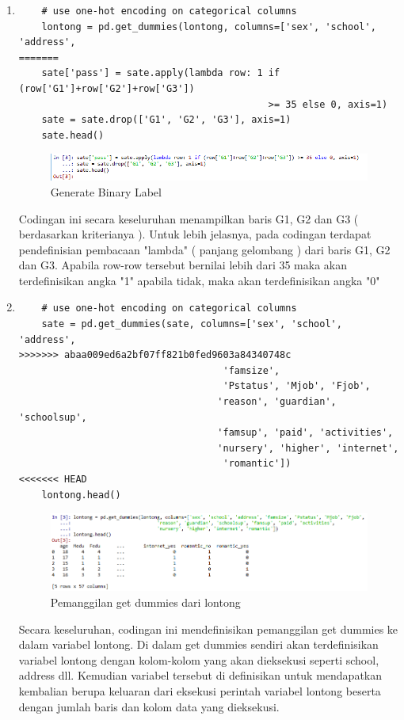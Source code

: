 \begin{enumerate}
\item
\begin{verbatim}
	# use one-hot encoding on categorical columns
	lontong = pd.get_dummies(lontong, columns=['sex', 'school', 'address', 
=======
	sate['pass'] = sate.apply(lambda row: 1 if (row['G1']+row['G2']+row['G3']) 
											>= 35 else 0, axis=1)
	sate = sate.drop(['G1', 'G2', 'G3'], axis=1)
	sate.head()
\end{verbatim}
\begin{figure}[ht]
\centering
\includegraphics[scale=0.6]{figures/42.png}
\caption{Generate Binary Label}
\end{figure}
\par
	Codingan ini secara keseluruhan menampilkan  baris  G1, G2 dan G3 ( berdasarkan kriterianya ). Untuk lebih jelasnya, pada codingan terdapat pendefinisian pembacaan "lambda" ( panjang gelombang ) dari baris G1, G2 dan G3. Apabila row-row tersebut bernilai lebih dari 35 maka akan terdefinisikan angka "1" apabila tidak, maka akan terdefinisikan angka "0"
\item
\begin{verbatim}
	# use one-hot encoding on categorical columns
	sate = pd.get_dummies(sate, columns=['sex', 'school', 'address', 
>>>>>>> abaa009ed6a2bf07ff821b0fed9603a84340748c
									'famsize', 
									'Pstatus', 'Mjob', 'Fjob', 
	                               'reason', 'guardian', 'schoolsup', 
								   'famsup', 'paid', 'activities',
	                               'nursery', 'higher', 'internet', 
									'romantic'])
<<<<<<< HEAD
	lontong.head()
\end{verbatim}
\begin{figure}[ht]
\centering
\includegraphics[scale=0.6]{figures/lontong/3.png}
\caption{Pemanggilan get dummies dari lontong}
\end{figure}
\par
	Secara keseluruhan, codingan ini mendefinisikan pemanggilan get dummies ke dalam variabel lontong. Di dalam get dummies sendiri akan terdefinisikan variabel lontong dengan kolom-kolom yang akan dieksekusi seperti school, address dll. Kemudian variabel tersebut di definisikan untuk mendapatkan kembalian berupa keluaran dari eksekusi perintah variabel lontong beserta dengan jumlah baris dan kolom data yang dieksekusi.

\end{enumerate}

